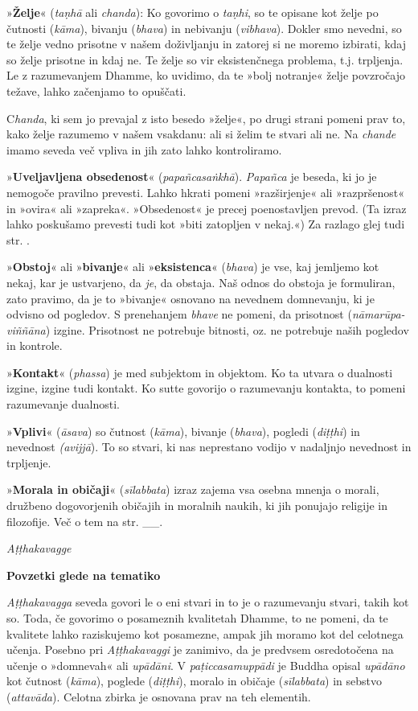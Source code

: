 »\textbf{Želje}« (\emph{taṇhā} ali \emph{chanda}): Ko govorimo o
\emph{taṇhi}, so te opisane kot želje po čutnosti (\emph{kāma}), bivanju
(\emph{bhava}) in nebivanju (\emph{vibhava}). Dokler smo nevedni, so te
želje vedno prisotne v našem doživljanju in zatorej si ne moremo
izbirati, kdaj so želje prisotne in kdaj ne. Te želje so vir
eksistenčnega problema, t.j. trpljenja. Le z razumevanjem Dhamme, ko
uvidimo, da te »bolj notranje« želje povzročajo težave, lahko začenjamo
to opuščati.

C\emph{handa}, ki sem jo prevajal z isto besedo »želje«, po drugi
strani pomeni prav to, kako želje razumemo v našem vsakdanu: ali si
želim te stvari ali ne. Na \emph{chande} imamo seveda več vpliva in jih
zato lahko kontroliramo.

»\textbf{Uveljavljena obsedenost}« (\emph{papañcasaṅkhā}).
\emph{Papañca} je beseda, ki jo je nemogoče pravilno prevesti. Lahko
hkrati pomeni »razširjenje« ali »razpršenost« in »ovira« ali »zapreka«.
»Obsedenost« je precej poenostavljen prevod. (Ta izraz lahko poskušamo
prevesti tudi kot »biti zatopljen v nekaj.«) Za razlago glej tudi str. .

»\textbf{Obstoj}« ali »\textbf{bivanje}« ali »\textbf{eksistenca}«
(\emph{bhava}) je vse, kaj jemljemo kot nekaj, kar je ustvarjeno, da
\emph{je}, da obstaja. Naš odnos do obstoja je formuliran, zato pravimo,
da je to »bivanje« osnovano na nevednem domnevanju, ki je odvisno od
pogledov. S prenehanjem \emph{bhave} ne pomeni, da prisotnost
(\emph{nāmarūpa-viññāna}) izgine. Prisotnost ne potrebuje bitnosti, oz.
ne potrebuje naših pogledov in kontrole.

»\textbf{Kontakt}« (\emph{phassa}) je med subjektom in objektom. Ko ta
utvara o dualnosti izgine, izgine tudi kontakt. Ko sutte govorijo o
razumevanju kontakta, to pomeni razumevanje dualnosti.

»\textbf{Vplivi}« (\emph{āsava}) so čutnost (\emph{kāma}), bivanje
(\emph{bhava}), pogledi (\emph{diṭṭhi}) in nevednost \emph{(avijjā}). To
so stvari, ki nas neprestano vodijo v nadaljnjo nevednost in trpljenje.

»\textbf{Morala in običaji}« (\emph{sīlabbata}) izraz zajema vsa osebna
mnenja o morali, družbeno dogovorjenih običajih in moralnih naukih, ki
jih ponujajo religije in filozofije. Več o tem na str. \_\_.

\emph{Aṭṭhakavagge}

\textbf{Povzetki glede na tematiko}

\emph{Aṭṭhakavagga} seveda govori le o eni stvari in to je o razumevanju
stvari, takih kot so. Toda, če govorimo o posameznih kvalitetah Dhamme,
to ne pomeni, da te kvalitete lahko raziskujemo kot posamezne, ampak jih
moramo kot del celotnega učenja. Posebno pri \emph{Aṭṭhakavaggi} je
zanimivo, da je predvsem osredotočena na učenje o »domnevah« ali
\emph{upādāni}. V \emph{paṭiccasamuppādi} je Buddha opisal
\emph{upādāno} kot čutnost (\emph{kāma}), poglede (\emph{diṭṭhi}),
moralo in običaje (\emph{sīlabbata}) in sebstvo (\emph{attavāda}).
Celotna zbirka je osnovana prav na teh elementih.

